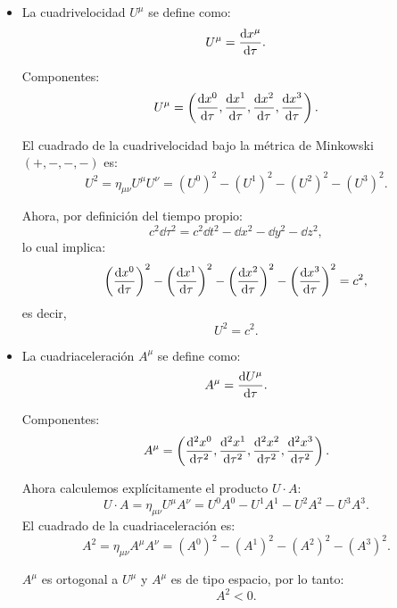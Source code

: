\documentclass{article}
\begin{document}
\begin{itemize}
    \item La cuadrivelocidad \( U^\mu \) se define como:
      \[
      U^\mu = \dv{x^\mu}{\tau}.
      \]

      Componentes:
      \[
      U^\mu = \left( \dv{x^0}{\tau}, \dv{x^1}{\tau}, \dv{x^2}{\tau}, \dv{x^3}{\tau} \right).
      \]

      El cuadrado de la cuadrivelocidad bajo la métrica de Minkowski \((+,-,-,-)\) es:
      \[
      U^2 = \eta_{\mu\nu} U^\mu U^\nu = (U^0)^2 - (U^1)^2 - (U^2)^2 - (U^3)^2.
      \]

      Ahora, por definición del tiempo propio:
      \[
      c^2 \dd{\tau}^2 = c^2 \dd{t}^2 - \dd{x}^2 - \dd{y}^2 - \dd{z}^2,
      \]
      lo cual implica:
      \[
      \left( \dv{x^0}{\tau} \right)^2 - \left( \dv{x^1}{\tau} \right)^2 - \left( \dv{x^2}{\tau} \right)^2 - \left( \dv{x^3}{\tau} \right)^2 = c^2,
      \]
      es decir,
      \[
      U^2 = c^2.
      \]

    \item La cuadriaceleración \( A^\mu \) se define como:
      \[
      A^\mu = \dv{U^\mu}{\tau}.
      \]

      Componentes:
      \[
      A^\mu = \left( \dv[2]{x^0}{\tau}, \dv[2]{x^1}{\tau}, \dv[2]{x^2}{\tau}, \dv[2]{x^3}{\tau} \right).
      \]

      Ahora calculemos explícitamente el producto \( U \cdot A \):
      \[
      U \cdot A = \eta_{\mu\nu} U^\mu A^\nu = U^0 A^0 - U^1 A^1 - U^2 A^2 - U^3 A^3.
      \]
      El cuadrado de la cuadriaceleración es:
\[
A^2 = \eta_{\mu\nu} A^\mu A^\nu = (A^0)^2 - (A^1)^2 - (A^2)^2 - (A^3)^2.
\]

\( A^\mu \) es ortogonal a \( U^\mu \) y \( A^\mu \) es de tipo espacio, por lo tanto:
\[
A^2 < 0.
\]
\end{itemize}






\section{}
\end{document}
